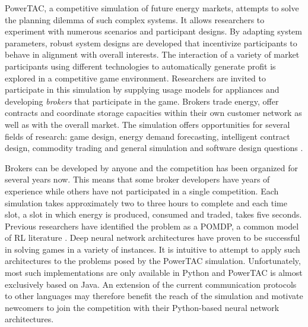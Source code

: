\ac{PowerTAC}, a competitive simulation of future energy markets, attempts to solve the planning dilemma of such
complex systems. It allows researchers to experiment with numerous scenarios and participant designs. By adapting system
parameters, robust system designs are developed that incentivize participants to behave in alignment with overall
interests. The interaction of a variety of market participants using different technologies to automatically generate
profit is explored in a competitive game environment. Researchers are invited to participate in this simulation by
supplying usage models for appliances and developing \emph{brokers} that participate in the game.  Brokers trade energy,
offer contracts and coordinate storage capacities within their own customer network as well as with the overall market.
The simulation offers opportunities for several fields of research: game design, energy demand forecasting,
intelligent contract design, commodity trading and general simulation and software design questions
\cite[]{ketter2015competitive, ketter2018powertac}.

Brokers can be developed by anyone and the competition has been organized for several years now. This means that some
broker developers have years of experience while others have not participated in a single competition. Each simulation
takes approximately two to three hours to complete and each time slot, a slot in which energy is produced, consumed and
traded, takes five seconds. Previous researchers have
identified the problem as a \ac{POMDP}, a common model of \ac {RL} literature \cite[]{tactexurieli2016mdp}. Deep neural network
architectures have proven to be successful in solving games in a variety of instances. It is intuitive to
attempt to apply such architectures to the problems posed by the \ac{PowerTAC} simulation. Unfortunately, most such
implementations are only available in Python \cite[]{baselines, plappert2016kerasrl, schaarschmidt2017tensorforce}  and
\ac{PowerTAC} is almost exclusively based on Java. An extension of the current communication protocols to other
languages may therefore benefit the reach of the simulation and motivate newcomers to join the competition with
their Python-based neural network architectures.

